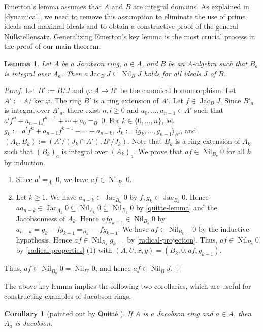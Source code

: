 \documentclass[11pt]{article}
\newtheorem{lemma}{Lemma}[section]
\newtheorem{corollary}{Corollary}[section]
\theoremstyle{definition}
\newcommand\gen[1]{\langle{#1}\rangle}
\DeclareMathOperator{\Nil}{Nil}
\DeclareMathOperator{\Jac}{Jac}
\begin{document}
Emerton's lemma assumes that $A$ and $B$ are integral domains.
As explained in \cref{dynamical}, we need to remove this assumption to eliminate the use of prime ideals and maximal ideals and to obtain a constructive proof of the general Nullstellensatz.
Generalizing Emerton's key lemma is the most crucial process in the proof of our main theorem.
\begin{lemma}\label{Emerton}
    Let $A$ be a Jacobson ring, $a\in A$, and $B$ be an $A$-algebra such that $B_a$ is integral over $A_a$.
    Then $a\Jac_BJ\subseteq\Nil_BJ$ holds for all ideals $J$ of $B$.
\end{lemma}
\begin{proof}
    Let $B':=B/J$ and $\varphi:A\to B'$ be the canonical homomorphism.
    Let $A':=A/{\ker{\varphi}}$. The ring $B'$ is a ring extension of $A'$.
    Let $f\in\Jac_BJ$.
    Since $B'_a$ is integral over $A'_a$, there exist $n,l\ge0$ and $a_0,\ldots,a_{n-1}\in A'$ such that $a^lf^n+a_{n-1}f^{n-1}+\cdots+a_0=_{B'}0$.
    For $k\in\{0,\ldots,n\}$, let $g_k:=a^lf^{k}+a_{n-1}f^{k-1}+\cdots+a_{n-k}$, $J_k:=\gen{g_k,\ldots,g_{n-1}}_{B'}$, and $(A_k,B_k):=(A'/(J_k\cap A'),B'/J_k)$.
    Note that $B_k$ is a ring extension of $A_k$ such that $(B_k)_a$ is integral over $(A_k)_a$.
    We prove that $af\in\Nil_{B_k}0$ for all $k$ by induction.
    \begin{enumerate}
        \item Since $a^l=_{A_0}0$, we have $af\in\Nil_{B_0}0$.
        \item
            Let $k\ge1$. We have $a_{n-k}\in\Jac_{B_k}0$ by $f,g_k\in\Jac_{B_k}0$.
            Hence $aa_{n-k}\in\Jac_{A_k}0\subseteq\Nil_{A_k}0\subseteq\Nil_{B_k}0$ by \cref{quitte-lemma} and the Jacobsonness of $A_k$. Hence $afg_{k-1}\in\Nil_{B_k}0$ by $a_{n-k}=g_k-fg_{k-1}=_{B_k}-fg_{k-1}$.
                We have $af\in\Nil_{B_{k-1}}0$ by the inductive hypothesis.
                Hence $af\in\Nil_{B_k}g_{k-1}$ by \cref{radical-projection}. Thus, $af\in\Nil_{B_k}0$ by \cref{radical-properties}-(1) with $(A,U,x,y)=(B_k,0,af,g_{k-1})$.
    \end{enumerate}
    Thus, $af\in\Nil_{B_n}0=\Nil_{B'}0$, and hence $af\in\Nil_BJ$.
\end{proof}
The above key lemma implies the following two corollaries, which are useful for constructing examples of Jacobson rings.
\begin{corollary}[pointed out by Quitté {\cite{Qui24}}]
    If $A$ is a Jacobson ring and $a\in A$, then $A_a$ is Jacobson.
\end{corollary}
\end{document}
